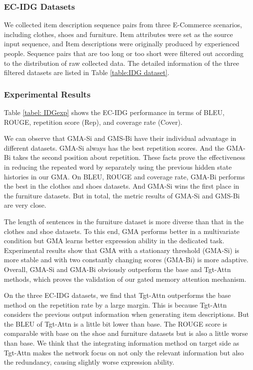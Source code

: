 \documentclass[letterpaper]{article} %
\begin{document}
\subsubsection{EC-IDG Datasets}

We collected item description sequence pairs from three E-Commerce scenarios, including clothes, shoes and furniture.
Item attributes were set as the source input sequence, and Item descriptions were originally produced by experienced people. 
Sequence pairs that are too long or too short were filtered out according to the distribution of raw collected data.
The detailed information of the three filtered datasets are listed in Table \ref{table:IDG dataset}.

\subsubsection{Experimental Results}
Table \ref{tabel: IDGexp} shows the EC-IDG performance in terms of BLEU, ROUGE, repetition score (Rep), and coverage rate (Cover).

We can observe that GMA-Si and GMS-Bi have their individual advantage in different datasets. GMA-Si always has the best repetition scores. 
And the GMA-Bi takes the second position about repetition. These facts prove the effectiveness in reducing the repeated word by separately using the previous hidden state histories in our GMA. On BLEU, ROUGE and coverage rate, GMA-Bi performs the best in the clothes and shoes datasets. And GMA-Si wins the first place in the furniture datasets. But in total, the metric results of GMA-Si and GMS-Bi are very close.

The length of sentences in the furniture dataset is more diverse than that in the clothes and shoe datasets. 
To this end, GMA performs better in a multivariate condition but GMA learns better expression ability in the dedicated task. 
Experimental results show that GMA with a stationary threshold (GMA-Si) is more stable and with two constantly changing scores (GMA-Bi) is more adaptive. Overall, GMA-Si and GMA-Bi obviously outperform the base and Tgt-Attn methods, which proves the validation of our gated memory attention mechanism.

On the three EC-IDG datasets, we find that Tgt-Attn outperforms the base method on the repetition rate by a large margin. 
This is because Tgt-Attn considers the previous output information when generating item descriptions. 
But the BLEU of Tgt-Attn is a little bit lower than base. 
The ROUGE score is comparable with base on the shoe and furniture datasets but is also a little worse than base. 
We think that the
integrating information method on target side
as Tgt-Attn
makes the network 
focus on 
not only the relevant information but also the redundancy, 
causing slightly worse expression ability.
\end{document}
